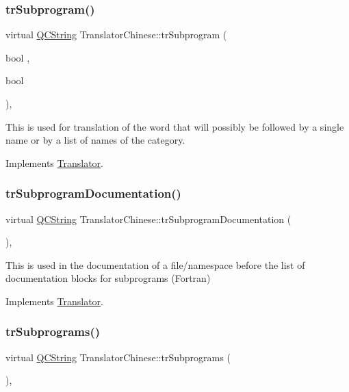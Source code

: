\subsubsection{\texorpdfstring{trSubprogram()}{trSubprogram()}}
{\footnotesize\ttfamily virtual \mbox{\hyperlink{class_q_c_string}{Q\+C\+String}} Translator\+Chinese\+::tr\+Subprogram (\begin{DoxyParamCaption}\item[{bool}]{,  }\item[{bool}]{ }\end{DoxyParamCaption})\hspace{0.3cm}{\ttfamily [inline]}, {\ttfamily [virtual]}}

This is used for translation of the word that will possibly be followed by a single name or by a list of names of the category. 

Implements \mbox{\hyperlink{class_translator}{Translator}}.

\mbox{\label{class_translator_chinese_a629a2e317851be06837a5e7d0b285bf0}} 
\subsubsection{\texorpdfstring{trSubprogramDocumentation()}{trSubprogramDocumentation()}}
{\footnotesize\ttfamily virtual \mbox{\hyperlink{class_q_c_string}{Q\+C\+String}} Translator\+Chinese\+::tr\+Subprogram\+Documentation (\begin{DoxyParamCaption}{ }\end{DoxyParamCaption})\hspace{0.3cm}{\ttfamily [inline]}, {\ttfamily [virtual]}}

This is used in the documentation of a file/namespace before the list of documentation blocks for subprograms (Fortran) 

Implements \mbox{\hyperlink{class_translator}{Translator}}.

\mbox{\label{class_translator_chinese_a928e1e68399241494a874d409dadf304}} 
\subsubsection{\texorpdfstring{trSubprograms()}{trSubprograms()}}
{\footnotesize\ttfamily virtual \mbox{\hyperlink{class_q_c_string}{Q\+C\+String}} Translator\+Chinese\+::tr\+Subprograms (\begin{DoxyParamCaption}{ }\end{DoxyParamCaption})\hspace{0.3cm}{\ttfamily [inline]}, {\ttfamily [virtual]}}

